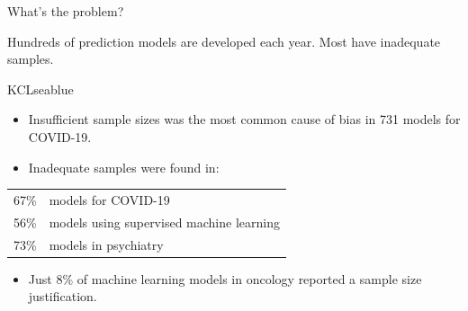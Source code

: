 \documentclass[11pt]{beamer}
\begin{document}
\begin{frame}[t]{What's the problem?}



	Hundreds of prediction models are developed each year. Most have
	inadequate samples.

	\begin{cbox}{KCLseablue}{}
		\large
		\begin{itemize}
			\item Insufficient sample sizes was the most common cause of bias
			      in 731 models for COVID-19.\autocite{wynants2020}
			\item Inadequate samples were found in: \vspace{0.5em}
		\end{itemize}
		\begin{tabular}{lp{}}
			{\Huge \alert{67\%}} & models for COVID-19\autocite{wynants2020}                      \\[0.5em]
			{\Huge \alert{56\%}} & models using supervised machine learning\autocite{navarro2021} \\[0.5em]
			{\Huge \alert{73\%}} & models in psychiatry\autocite{meehan2022}                      \\[0.3em]
		\end{tabular}
		\begin{itemize}
			\item Just \alert{8\%} of machine learning models in oncology
			      reported a sample size justification\autocite{dhiman2022}.
		\end{itemize}
	\end{cbox}
\end{frame}
\end{document}
